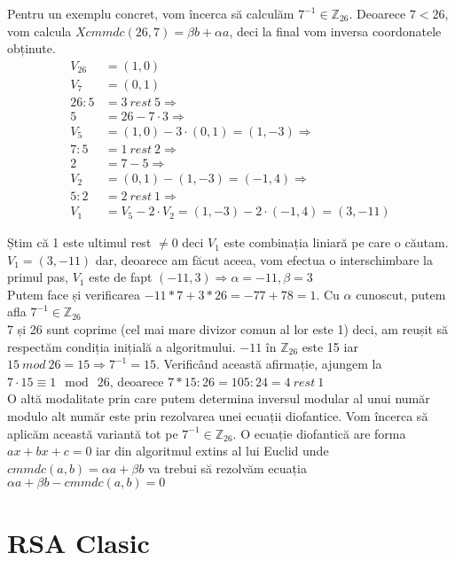\documentclass[12]{report}
\begin{document}
    Pentru un exemplu concret, vom încerca să calculăm $7^{-1} \in \mathbb{Z}_{26}$.
    Deoarece $ 7 < 26$, vom calcula $Xcmmdc(26,7)= \beta b + \alpha a$, deci la final vom inversa coordonatele obținute.
    \begin{align*}
    V_{26} &=(1,0) \\
    V_{7} &=(0,1) \\
    26 : 5 &= 3 \ rest \ 5 \Rightarrow \\
    5 &= 26 -7 \cdot 3 \Rightarrow \\
    V_5 &= (1,0) - 3 \cdot (0,1) = (1,-3) \Rightarrow \\
    7 :5 &= 1 \ rest \ 2  \Rightarrow \\
    2 &= 7-5 \Rightarrow \\
    V_2 &= (0,1) - (1,-3) = (-1,4) \Rightarrow \\
    5:2 &= 2 \ rest \ 1 \Rightarrow \\
    V_1 &= V_5 - 2 \cdot V_2 = (1,-3) - 2 \cdot (-1,4)= (3,-11)
    \end{align*}
    
    Știm că 1 este ultimul rest $\neq 0$ deci $V_1$ este combinația liniară pe care o căutam. $V_1 = (3,-11)$ dar, deoarece am făcut aceea, vom efectua o interschimbare la primul pas, $V_1$ este de fapt $(-11,3) \Rightarrow \alpha = -11 , \beta=3$ \\
    Putem face și verificarea $ -11 * 7 + 3 * 26 = -77 + 78  =1 $.
     Cu $ \alpha $ cunoscut, putem afla $ 7^{-1} \in \mathbb{Z}_{26} $ \\
     7 și 26 sunt coprime (cel mai mare divizor comun al lor este 1) deci, am reușit să respectăm condiția inițială a algoritmului. $-11$ în $\mathbb{Z}_{26}$ este 15 iar $15 \ mod \ 26 = 15 \Rightarrow 7^{-1} = 15$. Verificând această afirmație, ajungem la $7 \cdot 15 \equiv 1 \mod \ 26$, deoarece $7*15 : 26 = 105 : 24 = 4 \ rest \ 1$ \\
     O altă modalitate prin care putem determina inversul modular al unui număr modulo alt număr este prin rezolvarea unei ecuații diofantice. Vom încerca să aplicăm această variantă tot pe $7^{-1} \in \mathbb{Z}_{26}$. O ecuație diofantică are forma $ax +bx + c = 0$ iar din algoritmul extins al lui Euclid unde $ cmmdc(a,b) = \alpha a + \beta b$ va trebui să rezolvăm ecuația $ \alpha a + \beta b - cmmdc(a,b)=0$
     
    
    \section{RSA Clasic}
\end{document}
